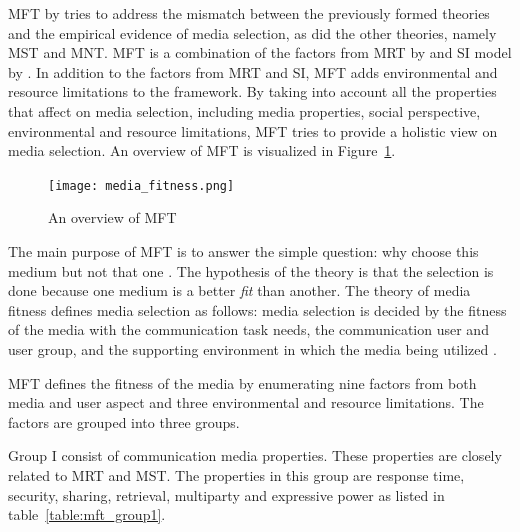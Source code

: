 \documentclass[english,12pt,a4paper,pdftex]{article}
\begin{document}
\Ac{MFT} by \citep{higa2007} tries to address the mismatch between the previously formed theories and the empirical evidence of media selection, as did the other theories, namely \ac{MST} and \ac{MNT}. \ac{MFT} is a combination of the factors from \ac{MRT} by \citet{daft1986} and \ac{SI} model by \citet{fulk1987}. In addition to the factors from \ac{MRT} and \ac{SI}, \ac{MFT} adds environmental and resource limitations to the framework. By taking into account all the properties that affect on media selection, including media properties, social perspective, environmental and resource limitations, \ac{MFT} tries to provide a holistic view on media selection. An overview of \ac{MFT} is visualized in Figure~\ref{fig:media_fitness}.

\begin{figure}[htb]
\begin{center}
\texttt{[image: media\_fitness.png]}
\end{center}
\caption{An overview of \ac{MFT} \citep{higa2007}}
\label{fig:media_fitness}
\end{figure}

The main purpose of \ac{MFT} is to answer the simple question: why choose this medium but not that one \citep{higa2007}. The hypothesis of the theory is that the selection is done because one medium is a better \emph{fit} than another. The theory of media fitness defines media selection as follows: media selection is decided by the fitness of the media with the communication task needs, the communication user and user group, and the supporting environment in which the media being utilized \citep{higa2007}.

\ac{MFT} defines the fitness of the media by enumerating nine factors from both media and user aspect and three environmental and resource limitations. The factors are grouped into three groups. 

Group I consist of communication media properties. These properties are closely related to \ac{MRT} and \ac{MST}. The properties in this group are response time, security, sharing, retrieval, multiparty and expressive power as listed in table~\ref{table:mft_group1}.
\end{document}
